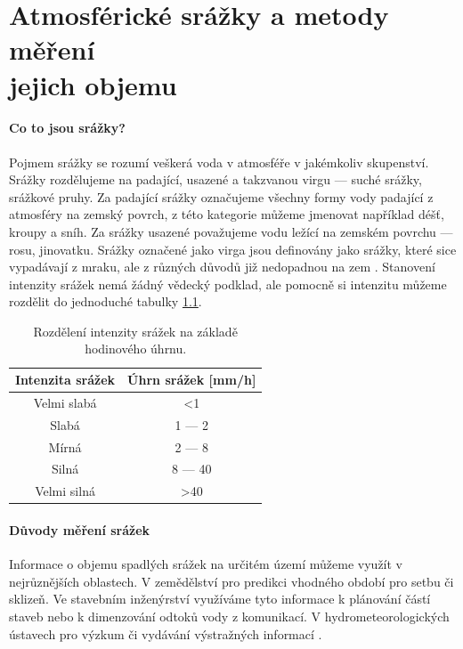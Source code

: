 \chapter{Atmosférické srážky a metody měření\\jejich objemu}
\subsubsection{Co to jsou srážky?}
    Pojmem srážky se rozumí veškerá voda v atmosféře v jakémkoliv skupenství. Srážky rozdělujeme na padající, usazené a takzvanou virgu — suché srážky, srážkové pruhy. Za padající srážky označujeme všechny formy vody padající z atmosféry na zemský povrch, z této kategorie můžeme jmenovat například déšť, kroupy a sníh. Za srážky usazené považujeme vodu ležící na zemském povrchu — rosu, jinovatku.  Srážky označené jako virga jsou definovány jako srážky, které sice vypadávají z mraku, ale z různých důvodů již nedopadnou na zem \cite{eunxinImJJLla7m6}. Stanovení intenzity srážek nemá žádný vědecký podklad, ale pomocně si intenzitu můžeme rozdělit do jednoduché tabulky  \ref{table:rozděleníSrážek}.
    
    \begin{table}[!h]
      \caption[Rozdělení srážek]{Rozdělení intenzity srážek na základě hodinového úhrnu.}
      \label{table:rozděleníSrážek}
      \begin{center}
      	\small
    	  \begin{tabular}{|c|c|}
    	    \hline
    	    Intenzita srážek & Úhrn srážek [mm/h]\\
    	    \hline\hline
    	    Velmi slabá & <1 \\
    	    \hline
    	    Slabá & 1 — 2  \\
    	    \hline
    	    Mírná & 2 — 8  \\
    	    \hline
    	    Silná & 8 — 40  \\
    	    \hline
    	    Velmi silná & >40  \\
    	    \hline
    	  \end{tabular}
      \end{center}
    \end{table}
    
\subsubsection{Důvody měření srážek}
    Informace o objemu spadlých srážek na určitém území můžeme využít v nejrůznějších oblastech. V zemědělství pro predikci vhodného období pro setbu či sklizeň. Ve stavebním inženýrství využíváme tyto informace k plánování částí staveb nebo k dimenzování odtoků vody z komunikací. V hydrometeorologických ústavech pro výzkum či vydávání výstražných informací \cite{wR7t0M6HVRhIssnr}.
    
